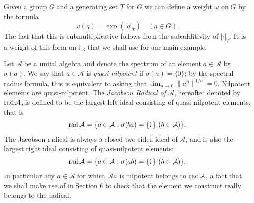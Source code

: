 \documentclass[twoside,11pt]{amsart}
\numberwithin{equation}{section}
\theoremstyle{definition}
\newcommand {\A}{\mathcal A}
\newcommand{\rad}{{\rm rad\,}}
\newcommand{\1}{\mathbbm{1}}
\newcommand{\F}{\mathbb F}
\begin{document}
	Given a group $G$ and a generating set $T$ for $G$ we can define a weight $\omega$ on $G$ by the formula 
	$$\omega(g) = \exp(|g|_T) \quad (g \in G).$$
	The fact that this is submultiplicative follows from the 
	subadditivity of $|\cdot |_T$. It is a weight of this form on $\F_3$ that we shall use for our main example.
	
	Let $\A$ be a unital algebra and denote the spectrum of an element $a \in \A$ by $\sigma(a)$. We say that $a \in \A$ is \textit{quasi-nilpotent} if $\sigma(a) = \{ 0 \}$; by the spectral radius formula, this is equivalent to asking that $\lim_{n \to 0} \| a^n \|^{1/n} = 0$. Nilpotent elements are quasi-nilpotent. The \textit{Jacobson Radical of $\A$}, hereafter denoted by $\rad \A$, is defined to be
	the largest left  ideal consisting of quasi-nilpotent elements, that is
	$$\rad \A = \{ a \in \A : \sigma(ba) = \{0\} \ (b \in \A) \}.$$
	The Jacobson radical is always a closed two-sided ideal of $\A$, and is also the largest right ideal consisting of quasi-nilpotent elements:
	$$\rad \A = \{ a \in \A : \sigma(ab) = \{0\} \ (b \in \A) \}.$$
	In particular any $a \in \A$ for which $\A a$ is nilpotent belongs to $\rad \A$, a fact that we shall make use of in Section 6 to check that the element we construct really belongs to the radical. 
	
	
	
\end{document}

